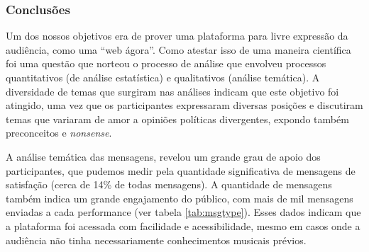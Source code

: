 


\subsubsection{Conclusões}


Um dos nossos objetivos era de prover uma plataforma para livre expressão da audiência, como uma ``web ágora''. Como atestar isso de uma maneira científica foi uma questão que norteou o processo de análise que envolveu processos quantitativos (de análise estatística) e qualitativos (análise temática). A diversidade de temas que surgiram nas análises indicam que este objetivo foi atingido, uma vez que os participantes expressaram diversas posições e discutiram temas que variaram de amor a opiniões políticas divergentes, expondo também preconceitos e \emph{nonsense}.

A análise temática das mensagens, revelou um grande grau de apoio dos participantes, que pudemos medir pela quantidade significativa de mensagens de satisfação (cerca de 14\% de todas mensagens). A quantidade de mensagens também indica um grande engajamento do público, com mais de mil mensagens enviadas a cada performance (ver tabela \ref{tab:msgtype}). Esses dados indicam que a plataforma foi acessada com facilidade e acessibilidade, mesmo em casos onde a audiência não tinha necessariamente conhecimentos musicais prévios. 


